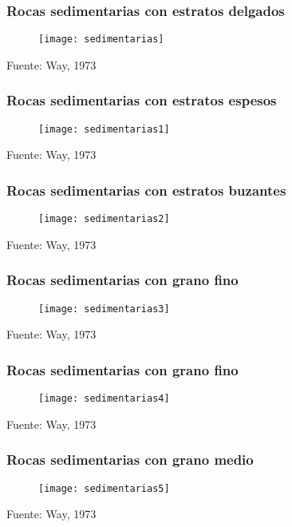 \documentclass[14pt]{beamer}
\begin{document}
  \begin{frame}
\frametitle{Rocas sedimentarias con estratos delgados}
 \begin{figure}
    \centering
    \texttt{[image: sedimentarias]}
  \end{figure}
  \tiny{Fuente: Way, 1973}
\end{frame}
  \begin{frame}
\frametitle{Rocas sedimentarias con estratos espesos}
 \begin{figure}
    \centering
    \texttt{[image: sedimentarias1]}
  \end{figure}
  \tiny{Fuente: Way, 1973}
\end{frame}
  \begin{frame}
\frametitle{Rocas sedimentarias con estratos buzantes}
 \begin{figure}
    \centering
    \texttt{[image: sedimentarias2]}
  \end{figure}
  \tiny{Fuente: Way, 1973}
\end{frame}
  \begin{frame}
\frametitle{Rocas sedimentarias con grano fino}
 \begin{figure}
    \centering
    \texttt{[image: sedimentarias3]}
  \end{figure}
  \tiny{Fuente: Way, 1973}
\end{frame}
  \begin{frame}
\frametitle{Rocas sedimentarias con grano fino}
 \begin{figure}
    \centering
    \texttt{[image: sedimentarias4]}
  \end{figure}
  \tiny{Fuente: Way, 1973}
\end{frame}
  \begin{frame}
\frametitle{Rocas sedimentarias con grano medio}
 \begin{figure}
    \centering
    \texttt{[image: sedimentarias5]}
  \end{figure}
  \tiny{Fuente: Way, 1973}
\end{frame}
\end{document}
